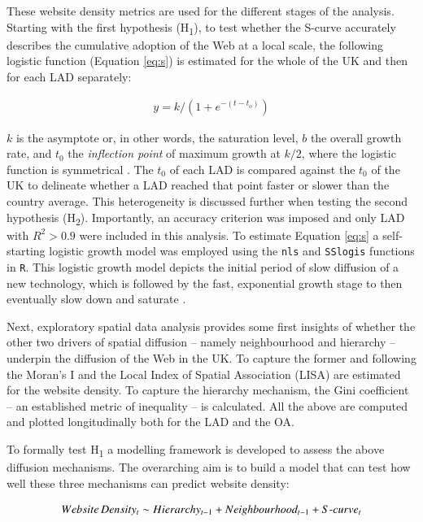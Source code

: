 \documentclass[
  authoryear,
  preprint,
  3p]{elsarticle}
\begin{document}
These website density metrics are used for the different stages of the
analysis. Starting with the first hypothesis (H\textsubscript{1}), to
test whether the S-curve accurately describes the cumulative adoption of
the Web at a local scale, the following logistic function (Equation
\ref{eq:s}) is estimated for the whole of the UK and then for each LAD
separately:

\begin{align}
y = k /(1 + e^{-(t-t_{o})})\label{eq:s}
\end{align}

\noindent \(k\) is the asymptote or, in other words, the saturation
level, \(b\) the overall growth rate, and \(t_{0}\) the \emph{inflection
point} of maximum growth at \(k/2\), where the logistic function is
symmetrical \citep{wilson201281}. The \(t_0\) of each LAD is compared
against the \(t_0\) of the UK to delineate whether a LAD reached that
point faster or slower than the country average. This heterogeneity is
discussed further when testing the second hypothesis
(H\textsubscript{2}). Importantly, an accuracy criterion was imposed and
only LAD with \(R^2 > 0.9\) were included in this analysis. To estimate
Equation \ref{eq:s} a self-starting logistic growth model was employed
using the \texttt{nls} and \texttt{SSlogis} functions in \texttt{R}.
This logistic growth model depicts the initial period of slow diffusion
of a new technology, which is followed by the fast, exponential growth
stage to then eventually slow down and saturate
\citep{wilson201281, grubler1999dynamics}.

Next, exploratory spatial data analysis provides some first insights of
whether the other two drivers of spatial diffusion -- namely
neighbourhood and hierarchy -- underpin the diffusion of the Web in the
UK. To capture the former and following \citet{ding2010modeling} the
Moran's I and the Local Index of Spatial Association (LISA) are
estimated for the website density. To capture the hierarchy mechanism,
the Gini coefficient -- an established metric of inequality -- is
calculated. All the above are computed and plotted longitudinally both
for the LAD and the OA.

To formally test H\textsubscript{1} a modelling framework is developed
to assess the above diffusion mechanisms. The overarching aim is to
build a model that can test how well these three mechanisms can predict
website density:

\begin{align}
Website\,Density_{t} \sim Hierarchy_{t-1} + Neighbourhood_{t-1} + S\text-curve_{t}\label{eq:rf.generic}
\end{align}
\end{document}
